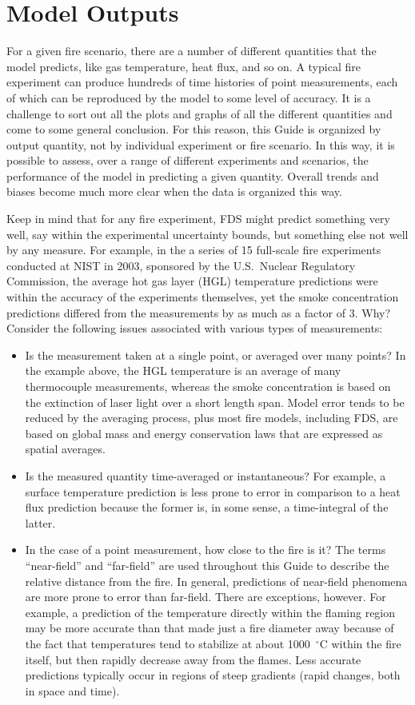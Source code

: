 \section{Model Outputs}

For a given fire scenario, there are a number of different quantities that the model predicts, like gas temperature, heat flux, and so on. A typical
fire experiment can produce hundreds of time histories of point measurements, each of which can be reproduced by the model to some level of accuracy.
It is a challenge to sort out all the plots and graphs of all the different quantities and come to some general conclusion. For this reason, this Guide
is organized by output quantity, not by individual experiment or fire scenario. In this way, it is possible to assess, over a range of different experiments
and scenarios, the performance of the model in predicting a given quantity. Overall trends and biases become much more clear when the data is organized this way.

Keep in mind that for any fire experiment, FDS might predict something very well, say within the experimental uncertainty bounds, but something else not well by
any measure. For example, in the a series of 15 full-scale fire experiments conducted at NIST in 2003, sponsored by the U.S.~Nuclear Regulatory Commission, the 
average hot gas layer (HGL) temperature predictions were within the accuracy of the experiments themselves, yet the smoke concentration predictions differed from the
measurements by as much as a factor of 3. Why? Consider the following issues associated with various types of measurements:
\begin{itemize}
\item Is the measurement taken at a single point, or averaged over many points? In the example above, the HGL temperature is an average of many
thermocouple measurements, whereas the smoke concentration is based on the extinction of laser light over a short length span. Model error tends to be
reduced by the averaging process, plus most fire models, including FDS, are based on global mass and energy conservation laws that are expressed as 
spatial averages.
\item Is the measured quantity time-averaged or instantaneous? For example, a surface temperature prediction is less prone to error in comparison to a 
heat flux prediction because the former is, in some sense, a time-integral of the latter.
\item In the case of a point measurement, how close to the fire is it? The terms ``near-field'' and ``far-field'' are used throughout this Guide to describe 
the relative distance from the fire. In general, predictions of near-field phenomena are more prone to error than far-field. There are exceptions, however. For example,
a prediction of the temperature directly within the flaming region may be more accurate than that made just a fire diameter away because of the fact that temperatures
tend to stabilize at about 1000~$^\circ$C within the fire itself, but then rapidly decrease away from the flames. Less accurate predictions typically occur in regions
of steep gradients (rapid changes, both in space and time).
\end{itemize}




